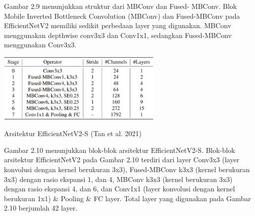Gambar 2.9 menunjukkan struktur dari MBConv dan Fused- MBConv. Blok Mobile Inverted Bottleneck Convolution (MBConv) dan Fused-MBConv pada EfficientNetV2 memiliki sedikit perbedaan layer yang digunakan. MBConv menggunakan depthwise conv3x3 dan Conv1x1, sedangkan Fused-MBConv menggunakan Conv3x3.

\begin{afigure}
    \includegraphics[width=0.6\textwidth, center]{images/Picture10.png}
    \caption{Arsitektur EfficientNetV2-S (Tan et al. 2021)}
    \label{fig:efficientnetv2} 
\end{afigure}

Gambar 2.10 menunjukkan blok-blok arsitektur EfficientNetV2-S. Blok-blok arsitektur EfficientNetV2 pada Gambar 2.10 terdiri dari layer Conv3x3 (layer konvolusi dengan kernel berukuran 3x3), Fused-MBConv k3x3 (kernel berukuran 3x3) dengan rasio ekspansi {1, dan 4}, MBConv k3x3 (kernel berukuran 3x3) dengan rasio ekspansi {4, dan 6}, dan Conv1x1 (layer konvolusi dengan kernel berukuran 1x1) \& Pooling \& FC layer. Total layer yang digunakan pada Gambar 2.10 berjumlah 42 layer.

